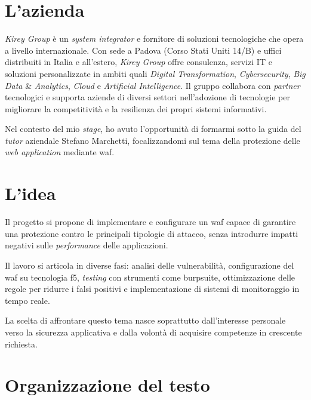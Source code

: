 \section{L'azienda}

\emph{Kirey Group} è un \emph{system integrator} e fornitore di soluzioni tecnologiche che opera a livello internazionale. Con sede a Padova (Corso Stati Uniti 14/B) e uffici distribuiti in Italia e all'estero, \emph{Kirey Group} offre consulenza, servizi IT e soluzioni personalizzate in ambiti quali \emph{Digital Transformation}, \emph{Cybersecurity}, \emph{Big Data} \& \emph{Analytics}, \emph{Cloud} e \emph{Artificial Intelligence}. Il gruppo collabora con \emph{partner} tecnologici e supporta aziende di diversi settori nell'adozione di tecnologie per migliorare la competitività e la resilienza dei propri sistemi informativi.

Nel contesto del mio \emph{stage}, ho avuto l'opportunità di formarmi sotto la guida del \emph{tutor} aziendale Stefano Marchetti, focalizzandomi sul tema della protezione delle \emph{web application} mediante \gls{waf}.

\section{L'idea}

Il progetto si propone di implementare e configurare un \gls{waf} capace di garantire una protezione contro le principali tipologie di attacco, senza introdurre impatti negativi sulle \emph{performance} delle applicazioni.

Il lavoro si articola in diverse fasi: analisi delle vulnerabilità, configurazione del \gls{waf} su tecnologia \gls{f5}, \emph{testing} con strumenti come \gls{burpsuite}, ottimizzazione delle regole per ridurre i falsi positivi e implementazione di sistemi di monitoraggio in tempo reale.

La scelta di affrontare questo tema nasce soprattutto dall'interesse personale verso la sicurezza applicativa e dalla volontà di acquisire competenze in crescente richiesta.

\section{Organizzazione del testo}


